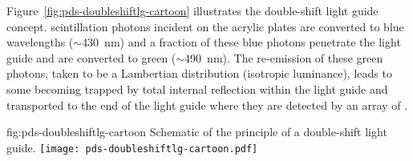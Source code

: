 Figure~\ref{fig:pds-doubleshiftlg-cartoon} illustrates the double-shift light guide concept.  scintillation photons incident on the acrylic plates are converted to blue wavelengths ($\sim$\SI{430}{nm}) and a fraction of these blue photons penetrate the light guide and are converted to green ($\sim$\SI{490}{nm}). The re-emission of these green photons, taken to be a Lambertian distribution (isotropic luminance), leads to some becoming trapped by total internal reflection within the light guide and  transported to the end of the light guide where they are detected by an array of .

\begin{dunefigure}{fig:pds-doubleshiftlg-cartoon}
{Schematic of the principle of a double-shift light guide.}
  \texttt{[image: pds-doubleshiftlg-cartoon.pdf]}
\end{dunefigure}


%



